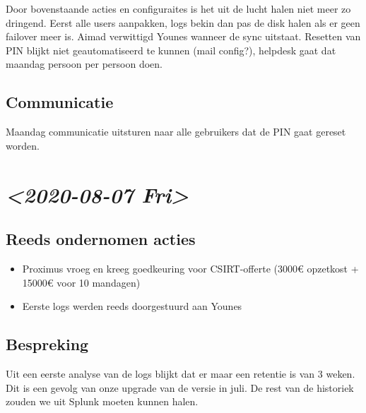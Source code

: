 \documentclass[11pt]{article}
\begin{document}
Door bovenstaande acties en configuraites is het uit de lucht halen niet meer zo dringend. Eerst alle users aanpakken, logs bekin dan pas de disk halen als er geen failover meer is. Aimad verwittigd Younes wanneer de sync uitstaat. Resetten van PIN blijkt niet geautomatiseerd te kunnen (mail config?), helpdesk gaat dat maandag persoon per persoon doen.

\subsection{Communicatie}
\label{sec:org58f59e3}

Maandag communicatie uitsturen naar alle gebruikers dat de PIN gaat gereset worden.

\section{\textit{<2020-08-07 Fri>}}
\label{sec:orga0de539}

\subsection{Reeds ondernomen acties}
\label{sec:orgfee9407}
\begin{itemize}
\item Proximus vroeg en kreeg goedkeuring voor CSIRT-offerte (3000€ opzetkost + 15000€ voor 10 mandagen)
\item Eerste logs werden reeds doorgestuurd aan Younes
\end{itemize}

\subsection{Bespreking}
\label{sec:org9c72492}

Uit een eerste analyse van de logs blijkt dat er maar een retentie is van 3 weken. Dit is een gevolg van onze upgrade van de versie in juli. De rest van de historiek zouden we uit Splunk moeten kunnen halen.
\end{document}
